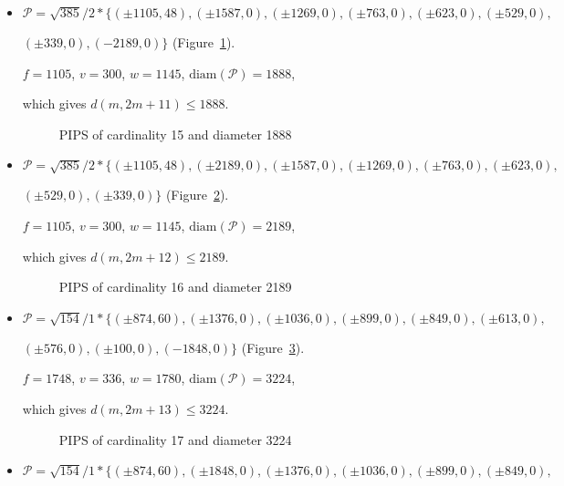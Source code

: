 \documentclass[12pt]{article}
\theoremstyle{theorem}
\theoremstyle{dfn}
\theoremstyle{remark}
\begin{document}
\begin{itemize}
\item
$\mathcal{P}=\sqrt{385}/{2} * \{ (\pm 1105, 48),
(\pm 1587 , 0),
(\pm 1269 , 0),
(\pm 763 , 0),
(\pm 623 , 0),
(\pm 529 , 0),
$

$
(\pm 339 , 0),
(-2189 , 0)\}
$
(Figure~\ref{picture_8.png}).

$f = 1105$, $v = 300$, $w = 1145$, $\operatorname{diam(\mathcal{P})} = 1888$,

which gives $d(m, 2m + 11) \leq 1888$.


\begin{figure}[h!]
\parbox{0.75\linewidth}{\caption{PIPS of cardinality 15 and diameter 1888}
\label{picture_8.png}}
\end{figure}


\item
$\mathcal{P}=\sqrt{385}/{2} * \{ (\pm 1105, 48),
(\pm 2189 , 0),
(\pm 1587 , 0),
(\pm 1269 , 0),
(\pm 763 , 0),
(\pm 623 , 0),
$

$
(\pm 529 , 0),
(\pm 339 , 0)\}
$
(Figure~\ref{picture_9.png}).

$f = 1105$, $v = 300$, $w = 1145$, $\operatorname{diam(\mathcal{P})} = 2189$,

which gives $d(m, 2m + 12) \leq 2189$.


\begin{figure}[h!]
\parbox{0.75\linewidth}{\caption{PIPS of cardinality 16 and diameter 2189}
\label{picture_9.png}}
\end{figure}


\item
$\mathcal{P}=\sqrt{154}/{1} * \{ (\pm 874, 60),
(\pm 1376 , 0),
(\pm 1036 , 0),
(\pm 899 , 0),
(\pm 849 , 0),
(\pm 613 , 0),
$

$
(\pm 576 , 0),
(\pm 100 , 0),
(-1848 , 0)\}
$
(Figure~\ref{picture_13.png}).

$f = 1748$, $v = 336$, $w = 1780$, $\operatorname{diam(\mathcal{P})} = 3224$,

which gives $d(m, 2m + 13) \leq 3224$.


\begin{figure}[h!]
\parbox{0.85\linewidth}{\caption{PIPS of cardinality 17 and diameter 3224}
\label{picture_13.png}}
\end{figure}


\item
$\mathcal{P}=\sqrt{154}/{1} * \{ (\pm 874, 60),
(\pm 1848 , 0),
(\pm 1376 , 0),
(\pm 1036 , 0),
(\pm 899 , 0),
(\pm 849 , 0),
$


\end{itemize}
\end{document}
